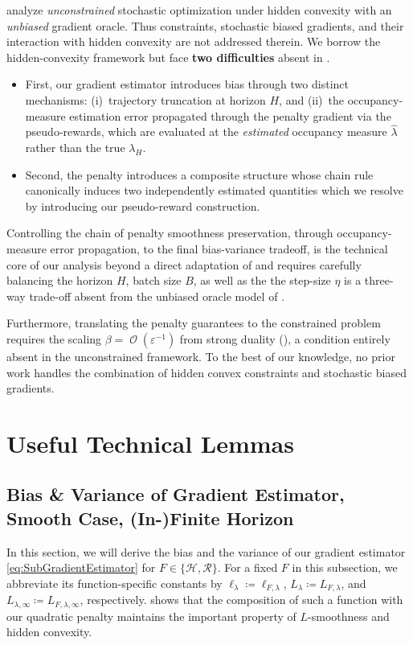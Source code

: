 \documentclass{article}
\theoremstyle{plain}
\theoremstyle{definition}
\theoremstyle{remark}
\DeclareMathOperator{\OOSym}{\mathcal{O}}
\newcommand{\OO}[1]{{\OOSym\!\left(#1\right)}}
\def\epsilon{{\varepsilon}}
\newcommand{\define}{\coloneqq}
\def\lambdaHat{{\widehat{\lambda}}}
\def\HH{{\mathcal{H}}}
\def\Reg{{\mathcal{R}}}
\begin{document}
\citet{fatkhullinStochasticOptimizationHidden2025} analyze
\emph{unconstrained} stochastic optimization under hidden convexity with an
\emph{unbiased} gradient oracle. Thus constraints, stochastic biased gradients,
and their interaction with hidden convexity are not addressed therein.
We borrow the hidden-convexity framework but face \textbf{two difficulties} absent
in \citet{fatkhullinStochasticOptimizationHidden2025}.
\begin{itemize}
 \item First, our gradient estimator introduces bias through two distinct
       mechanisms: (i)~trajectory truncation at horizon $H$, and (ii)~the
       occupancy-measure estimation error propagated through the penalty gradient
       via the pseudo-rewards, which are evaluated at the \emph{estimated}
       occupancy measure $\lambdaHat$ rather than the true $\lambda_H$.
 \item Second, the penalty introduces a composite structure whose chain rule
       canonically induces two independently estimated quantities which we resolve
       by introducing our pseudo-reward construction.
\end{itemize}
Controlling the chain of penalty smoothness preservation, through occupancy-measure
error propagation, to the final bias-variance tradeoff, is the technical
core of our analysis beyond a direct adaptation of
\citet{fatkhullinStochasticOptimizationHidden2025} and requires carefully
balancing the horizon $H$, batch size $B$,
as well as the the step-size $\eta$ is a three-way trade-off
absent from the unbiased oracle model of
\citet{fatkhullinStochasticOptimizationHidden2025}.

Furthermore, translating the penalty guarantees to the constrained problem
requires the scaling $\beta = \OO{\epsilon^{-1}}$ from strong duality
(), a condition entirely absent in the
unconstrained framework. To the best of our knowledge, no prior work
handles the combination of hidden convex constraints and stochastic biased
gradients.



\section{Useful Technical Lemmas}
\label{sec:AppendixGradientEstimates}
\subsection{Bias \& Variance of Gradient Estimator, Smooth Case, (In-)Finite Horizon}
In this section, we will derive the bias and the variance of our gradient
estimator \eqref{eq:SubGradientEstimator} for $F \in \{\HH, \Reg\}$. For a
fixed $F$ in this subsection, we abbreviate its function-specific constants
by $\ell_\lambda\define\ell_{F,\lambda}$, $L_\lambda\define L_{F,\lambda}$,
and $L_{\lambda,\infty}\define L_{F,\lambda,\infty}$, respectively.
 shows that the composition of
such a function with our quadratic penalty maintains the important property
of $L$-smoothness and hidden convexity.
\end{document}
